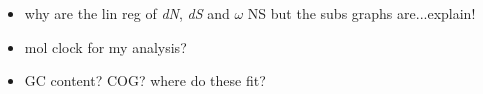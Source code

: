 \documentclass[12pt]{article}
\newcommand{\strep}{\textit{Streptomyces}\xspace}
\newcommand{\dn}{\textit{dN}\xspace}
\newcommand{\ds}{\textit{dS}\xspace}
\begin{document}
\begin{itemize}
%    
%    
%    
%    
%	
%	
%	
%	
%	
%	
	\item why are the lin reg of \dn, \ds and $\omega$ NS but the subs graphs are...explain!
%	
	
	\item mol clock for my analysis?
	
	\item GC content? COG? where do these fit?
	
\end{itemize}
\end{document}
